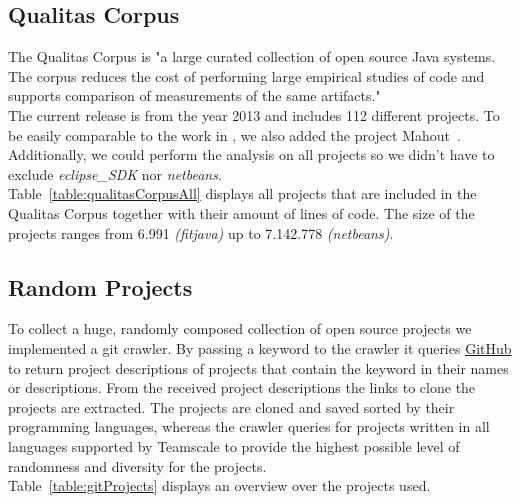 \subsection{Qualitas Corpus}
\label{section:qualitasCorpus}
The Qualitas Corpus is "a large curated collection of open source Java systems. The corpus reduces the cost of performing
large empirical studies of code and supports comparison of measurements of the same artifacts."\cite[p.~1]{TemperoEwanandAnslowCraigandDietrichJensandHanTedandLiJingandLumpeMarkusandMeltonHaydenandNoble2010a}\\
The current release is from the year 2013 and includes 112 different projects. To be easily comparable to the work in \cite{Bernwieser2014}, we also added the project Mahout~\cite{ApacheSoftwareFoundation}.\\
Additionally, we could perform the analysis on all projects so we didn't have to exclude \textit{eclipse\_SDK} nor \textit{netbeans}.\\
Table~\ref{table:qualitasCorpusAll} displays all projects that are included in the Qualitas Corpus together with their amount of lines of code. The size of the projects ranges from 6.991 \textit{(fitjava)} up to 7.142.778 \textit{(netbeans)}.


\subsection{Random Projects}
\label{section:randomGitProjects}
To collect a huge, randomly composed collection of open source projects we implemented a git crawler.
By passing a keyword to the crawler it queries \href{github.com}{GitHub} to return project descriptions of projects that contain the keyword in their names or descriptions. From the received project descriptions the links to clone the projects are extracted. The projects are cloned and saved sorted by their programming languages, whereas the crawler queries for projects written in all languages supported by Teamscale to provide the highest possible level of randomness and diversity for the projects.\\
Table~\ref{table:gitProjects} displays an overview over the projects used.


